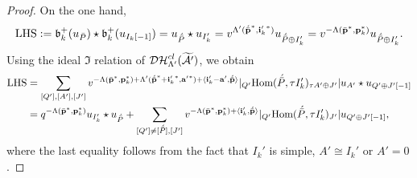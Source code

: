 \documentclass[reqno,12pt]{amsart}
\numberwithin{equation}{section}
\theoremstyle{plain} %
\theoremstyle{definition} %
\begin{document}
\begin{proof}
	
 On the one hand,
$${\rm LHS}:=\mathfrak{b}_k^+(u_{\bar{P}})\star \mathfrak{b}_k^+(u_{I_k[-1]})=u_{\acute{\bar{P}}}\star u_{I_k'}=v^{\Lambda'({\acute{\bar{\bf p}}}^\ast, {{\bf i}_k'}^\ast)}u_{{\acute{\bar{P}}}\oplus I_k'}=v^{-\Lambda({\bar{\bf p}}^\ast,{\bf p}_k^\ast)}u_{{\acute{\bar{P}}}\oplus I_k'}.$$
Using the ideal $\mathfrak{I}$ relation of $\mathcal{DH}_{\Lambda'}^{cl}(\widetilde{\mathcal{A}'})$, we obtain
\begin{align*}
{\rm LHS}&=\sum_{[Q'],[A'],[J']}v^{-\Lambda(\bar{\bf p}^\ast, {\bf p}_k^\ast)+\Lambda'({\acute{\bar{\bf p}}}^\ast+{{\bf i}_k'}^\ast,{{\bf a}'}^\ast)+\langle {\bf i}_k'-{\bf a}',{\acute{\bar{\bf p}}}\rangle} |_{Q'}\mbox{\rm Hom}({\acute{\bar{P}}},\tau I_k')_{\tau A'\oplus J'}|u_{A'}\star u_{Q'\oplus J'[-1]}\\
&=q^{-\Lambda(\bar{\bf p}^\ast, {\bf p}_k^\ast)}u_{I_k'}\star u_{\acute{\bar{P}}}+\sum_{[Q']\neq [\acute{\bar{P}}], [J']}v^{-\Lambda(\bar{\bf p}^\ast, {\bf p}_k^\ast)+\langle {\bf i}_k',{\acute{\bar{\bf p}}}\rangle}|_{Q'}\mbox{\rm Hom}({\acute{\bar{P}}},\tau I_k')_{J'}| u_{Q'\oplus J'[-1]},
\end{align*}
where the last equality follows from the fact that $I_k'$ is simple, $A'\cong I_k'$ or $A'=0$.
	

\end{proof}
\end{document}

